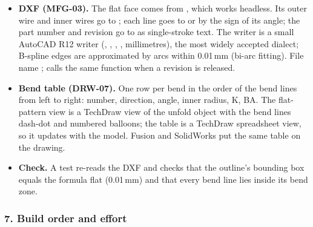 \begin{itemize}[nosep]
  \item \textbf{DXF (MFG-03).} The flat face comes from , which works
        headless. Its outer wire and inner wires go to ; each  line goes to  or
         by the sign of its angle; the part number and revision go to  as single-stroke text.
        The writer is a small AutoCAD R12 writer (, , , , millimetres),
        the most widely accepted dialect; B-spline edges are approximated by arcs within 0.01\,mm (bi-arc fitting).
        File name ;  calls the same function when a revision is released.
  \item \textbf{Bend table (DRW-07).} One row per bend in the order of the bend lines from left to right: number,
        direction, angle, inner radius, K, BA. The flat-pattern view is a TechDraw view of the unfold object with the
        bend lines dash-dot and numbered balloons; the table is a TechDraw spreadsheet view, so it updates with the
        model. Fusion and SolidWorks put the same table on the drawing.
  \item \textbf{Check.} A test re-reads the DXF and checks that the  outline's bounding box equals the
        formula flat (0.01\,mm) and that every bend line lies inside its bend zone.
\end{itemize}

\subsubsection*{7. Build order and effort}

